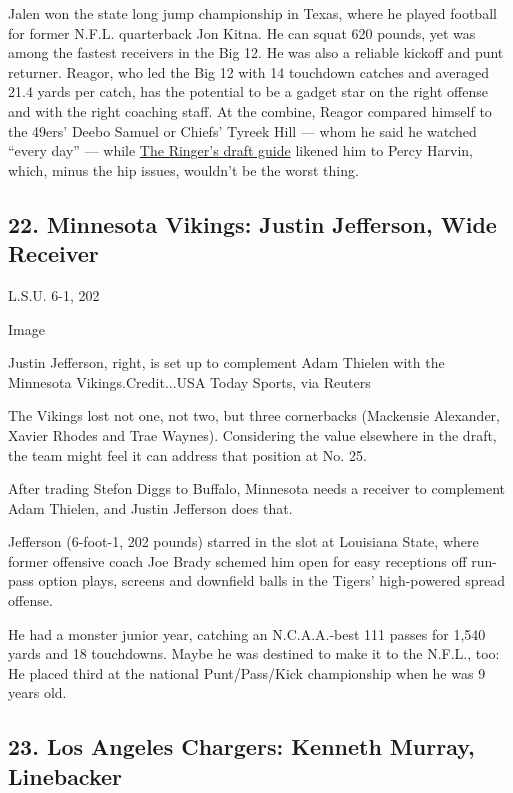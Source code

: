 Jalen won the state long jump championship in Texas, where he played
football for former N.F.L. quarterback Jon Kitna. He can squat 620
pounds, yet was among the fastest receivers in the Big 12. He was also a
reliable kickoff and punt returner. Reagor, who led the Big 12 with 14
touchdown catches and averaged 21.4 yards per catch, has the potential
to be a gadget star on the right offense and with the right coaching
staff. At the combine, Reagor compared himself to the 49ers' Deebo
Samuel or Chiefs' Tyreek Hill --- whom he said he watched ``every day''
--- while \href{https://nfldraft.theringer.com/}{The Ringer's draft
guide} likened him to Percy Harvin, which, minus the hip issues,
wouldn't be the worst thing.

\hypertarget{22-minnesota-vikings-justin-jefferson-wide-receiver}{%
\subsection{22. Minnesota Vikings: Justin Jefferson, Wide
Receiver}\label{22-minnesota-vikings-justin-jefferson-wide-receiver}}

L.S.U. 6-1, 202

Image

Justin Jefferson, right, is set up to complement Adam Thielen with the
Minnesota Vikings.Credit...USA Today Sports, via Reuters

The Vikings lost not one, not two, but three cornerbacks (Mackensie
Alexander, Xavier Rhodes and Trae Waynes). Considering the value
elsewhere in the draft, the team might feel it can address that position
at No. 25.

After trading Stefon Diggs to Buffalo, Minnesota needs a receiver to
complement Adam Thielen, and Justin Jefferson does that.

Jefferson (6-foot-1, 202 pounds) starred in the slot at Louisiana State,
where former offensive coach Joe Brady schemed him open for easy
receptions off run-pass option plays, screens and downfield balls in the
Tigers' high-powered spread offense.

He had a monster junior year, catching an N.C.A.A.-best 111 passes for
1,540 yards and 18 touchdowns. Maybe he was destined to make it to the
N.F.L., too: He placed third at the national Punt/Pass/Kick championship
when he was 9 years old.

\hypertarget{23-los-angeles-chargers-kenneth-murray-linebacker}{%
\subsection{23. Los Angeles Chargers: Kenneth Murray,
Linebacker}\label{23-los-angeles-chargers-kenneth-murray-linebacker}}

